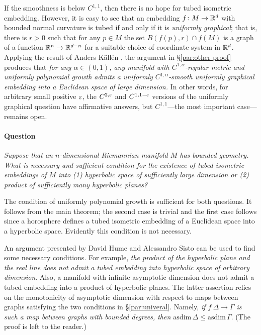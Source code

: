 \documentclass[a4paper,10pt]{article}
\begin{document}
If the smoothness is below $C^{1,1}$, then there is no hope for tubed isometric embedding.
However, it is easy to see that an embedding $f\colon M\to \mathbb{R}^d$ with bounded normal curvature is tubed if and only if it is \emph{uniformly graphical};
that is, there is $r>0$ such that for any $p\in M$ the set $B(f(p),r)\cap f(M)$ is a graph of a function $\mathbb{R}^n\to \mathbb{R}^{d-n}$ for a suitable choice of coordinate system in $\mathbb{R}^d$.
Applying the result of Anders K\"{a}ll\'{e}n \cite{kallen}, the argument in §\ref{par:other-proof} produces that 
\textit{for any $\alpha\in(0,1)$, any manifold with $C^{1,\alpha}$-regular metric and uniformly polynomial growth admits a  uniformly $C^{1,\alpha}$-smooth uniformly graphical embedding into a Euclidean space of large dimension.}
In other words, for arbitrary small positive $\varepsilon$, the $C^{2,\varepsilon}$ and $C^{1,1-\varepsilon}$ versions of the uniformly graphical question have affirmative answers, but $C^{1,1}$---the most important case---remains open.

\paragraph{Question}
\textit{Suppose that an $n$-dimensional Riemannian manifold $M$ has bounded geometry.
What is necessary and sufficient condition for the existence of tubed isometric embeddings of $M$
into (1) hyperbolic space of sufficiently large dimension or (2) product of sufficiently many hyperbolic planes?}

\medskip

The condition of uniformly polynomial growth is sufficient for both questions.
It follows from the main theorem; the second case is trivial and the first case follows 
since a horosphere defines a tubed isometric embedding of a Euclidean space into a hyperbolic space.
Evidently this condition is not necessary.

An argument presented by David Hume and Alessandro Sisto \cite[1.1]{hume-sisto} can be used to find some necessary conditions. For example, \textit{the product of the hyperbolic plane and the real line does not admit a tubed embedding into hyperbolic space of arbitrary dimension}.
Also, a manifold with infinite asymptotic dimension does not admit a tubed embedding into a product of hyperbolic planes.
The latter assertion relies on the monotonicity of asymptotic dimension with respect to maps between graphs satisfying the two conditions in §\ref{par:univeral}.
Namely, \textit{if $f\:\Delta\to \Gamma$ is such a map between graphs with bounded degrees, then $\mathrm{asdim}\,\Delta\le \mathrm{asdim}\,\Gamma$}.
(The proof is left to the reader.)
\end{document}

